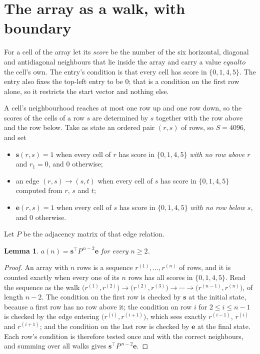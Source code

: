 \documentclass[11pt,a4paper]{article}
\theoremstyle{plain}
\newtheorem{lemma}[theorem]{Lemma}
\theoremstyle{definition}
\begin{document}
\section{The array as a walk, with boundary}

For a cell of the array let its \emph{score} be the number of the six horizontal, diagonal and antidiagonal neighbours that lie inside
the array and carry a value $equal to$ the cell's own. The entry's condition is that every cell
has score in $\{0,1,4,5\}$. The entry also fixes the top-left entry to be $0$; that is a condition on the first row alone, so it restricts the start vector and nothing else.

A cell's neighbourhood reaches at most one row up and one row down, so the scores of the
cells of a row $s$ are determined by $s$ together with the row above and the row below.
Take as state an ordered pair $(r,s)$ of rows, so $S=4096$, and set
\begin{itemize}
\item $\mathbf{s}(r,s)=1$ when every cell of $r$ has score in $\{0,1,4,5\}$ \emph{with no row
above $r$} and $r_1=0$, and $0$ otherwise;
\item an edge $(r,s)\to(s,t)$ when every cell of $s$ has score in $\{0,1,4,5\}$ computed from
$r$, $s$ and $t$;
\item $\mathbf{e}(r,s)=1$ when every cell of $s$ has score in $\{0,1,4,5\}$ \emph{with no row
below $s$}, and $0$ otherwise.
\end{itemize}
Let $P$ be the adjacency matrix of that edge relation.

\begin{lemma}\label{lem:walk}
$a(n)=\mathbf{s}^{\!\top}P^{\,n-2}\mathbf{e}$ for every $n\ge2$.
\end{lemma}

\begin{proof}
An array with $n$ rows is a sequence $r^{(1)},\dots,r^{(n)}$ of rows, and it is counted
exactly when every one of its $n$ rows has all scores in $\{0,1,4,5\}$. Read the sequence as the
walk $\bigl(r^{(1)},r^{(2)}\bigr)\to\bigl(r^{(2)},r^{(3)}\bigr)\to\cdots\to
\bigl(r^{(n-1)},r^{(n)}\bigr)$, of length $n-2$. The condition on the first row is
checked by $\mathbf{s}$ at the initial state, because a first row has no row above it; the
condition on row $i$ for $2\le i\le n-1$ is checked by the edge entering
$\bigl(r^{(i)},r^{(i+1)}\bigr)$, which sees exactly $r^{(i-1)}$, $r^{(i)}$ and
$r^{(i+1)}$; and the condition on the last row is checked by $\mathbf{e}$ at the final
state. Each row's condition is therefore tested once and with the correct neighbours, and
summing over all walks gives $\mathbf{s}^{\!\top}P^{\,n-2}\mathbf{e}$.
\end{proof}
\end{document}
